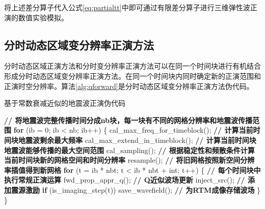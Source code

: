 将上述差分算子代入公式\ref{eq:partialtt}中即可通过有限差分算子进行三维弹性波正演的数值实验模拟。

\subsection{分时动态区域变分辨率正演方法}
分时动态区域正演方法和分时变分辨率正演方法可以在同一个时间块进行有机结合形成分时动态区域变分辨率正演方法。在同一个时间块内同时确定新的正演范围和正演时空分辨率。算法\ref{alg:qforward}是分时动态区域变分辨率正演方法伪代码。

\begin{algorithm}[ht]
\small
\caption{基于常数衰减近似的地震波正演伪代码} \label{alg:qforward}
\begin{algorithmic}[1]
\State \textbf{// 将地震波完整传播时间分成nb块，每一块有不同的网格分辨率和地震波传播范围}
\State \textbf{for} (ib = 0; ib < nb; ib++) \{ \label{ln:qfwdnb}
\State \quad\quad cal\_max\_freq\_for\_timeblock(); \textbf{// 计算当前时间块地震波剩余最大频率} \label{ln:calfreq}
\State \quad\quad cal\_max\_extend\_in\_timeblock(); \textbf{// 计算当前时间块地震波能够传播的最大空间范围} \label{ln:calextend}
\State \quad\quad cal\_sampling(); \textbf{// 根据稳定性和频散条件计算当前时间块新的网格空间和时间分辨率} \label{ln:calsampling}
\State \quad\quad resample(); \textbf{// 将旧网格按照新空间分辨率插值得到新网格} \label{ln:resample}
\State \quad\quad
\State \quad\quad \textbf{for} (t = ib * nbt; t < ib * nbt + int; t++) \{ \textbf{// 每个时间块中执行常规正演运算} \label{ln:tbbegin}
\State \quad\quad\quad\quad fwd\_prop\_appr\_q(); \textbf{// Q近似波场更新}
\State \quad\quad\quad\quad inject\_src(); \textbf{// 添加震源激励}
\State \quad\quad\quad\quad \textbf{if} (is\_imaging\_step(t))
\State \quad\quad\quad\quad\quad\quad save\_wavefield(); \textbf{// 为RTM成像存储波场} \label{ln:savewavefield}
\State \quad\quad \} \label{ln:tbend}
\State \} \label{ln:qfwdnbend}
\end{algorithmic}
\end{algorithm}

